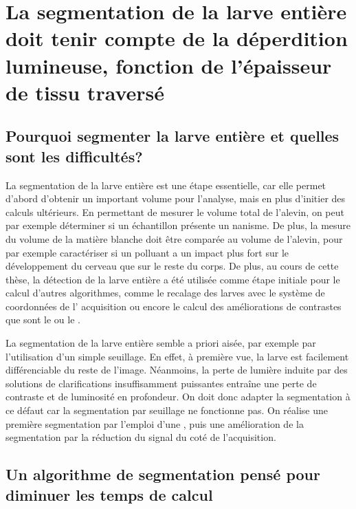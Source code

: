 \documentclass[\main/main.tex]{subfiles}
\begin{document}
\section{La segmentation de la larve entière doit tenir compte de la déperdition lumineuse, fonction de l'épaisseur de tissu traversé
\label{sec:algo:larva}
}

\subsection{Pourquoi segmenter la larve entière et quelles sont les difficultés?}

%
La segmentation de la larve entière est une étape essentielle, car elle permet d'abord d'obtenir un important volume pour l'analyse, mais en plus d'initier des calculs ultérieurs.
%
En permettant de mesurer le volume total de l'alevin, on peut par exemple déterminer si un échantillon présente un nanisme. De plus, la mesure du volume de la matière blanche doit être comparée au volume de l'alevin,  pour par exemple caractériser si un polluant a un impact plus fort sur le développement du cerveau que sur le reste du corps.
%
De plus, au cours de cette thèse, la détection de la larve entière a été utilisée comme étape initiale pour le calcul d'autres algorithmes, comme le recalage des larves avec le système de coordonnées de l' acquisition ou encore le calcul des améliorations de contrastes que sont le \sbddcc{} ou le \sblc{}.

%
La segmentation de la larve entière semble a priori aisée, par exemple par l'utilisation d'un simple seuillage. En effet, à première vue, la larve est facilement différenciable du reste de l'image. Néanmoins, la perte de lumière induite par des solutions de clarifications insuffisamment puissantes entraîne une perte de contraste et de luminosité en profondeur.
On doit donc adapter la segmentation à ce défaut car la segmentation par seuillage ne fonctionne pas. On réalise une première segmentation par l'emploi d'une \watershed{}, puis une amélioration de la segmentation par la réduction du signal du coté de l'acquisition.

\subsection{Un algorithme de segmentation pensé pour diminuer les temps de calcul}
\end{document}
